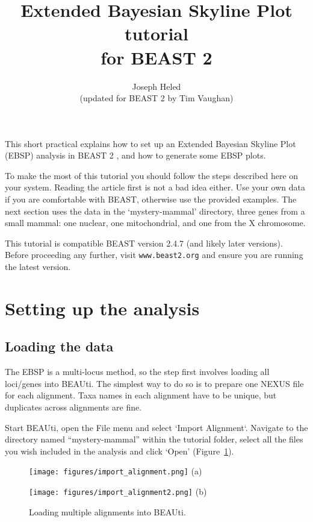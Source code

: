 \documentclass[a4paper,11pt]{article}
\title{Extended Bayesian Skyline Plot tutorial\\for BEAST 2}
\author{Joseph Heled\\(updated for BEAST 2 by Tim Vaughan)}
\date{}
\begin{document}
\maketitle

This short practical explains how to set up an Extended Bayesian Skyline Plot
(EBSP) analysis in BEAST 2 \citep{Bouckaert2014}, and how to generate some EBSP
plots.

To make the most of this tutorial you should follow the steps described here on
your system. Reading the article \citep{Heled2008} first is not a bad idea
either. Use your own data if you are comfortable with BEAST, otherwise use the
provided examples.  The next section uses the data in the `mystery-mammal'
directory, three genes from a small mammal: one nuclear, one mitochondrial, and
one from the X chromosome.

This tutorial is compatible BEAST version 2.4.7 (and likely later
versions). Before proceeding any further, visit
\texttt{www.beast2.org} and ensure you are running the latest version.

\section{Setting up the analysis}

\subsection{Loading the data}

The EBSP is a multi-locus method, so the step first involves loading all
loci/genes into BEAUti. The simplest way to do so is to prepare one NEXUS file
for each alignment. Taxa names in each alignment have to be unique, but
duplicates across alignments are fine.

Start BEAUti, open the File menu and select `Import Alignment`.  Navigate to
the directory named ``mystery-mammal'' within the tutorial folder, select all the files you wish included in the analysis and
click `Open' (Figure~\ref{fig:importAlignment}).

\begin{figure}[h!]
    \centering
    \hspace{-0.5cm}\begin{minipage}[b]{0.4\textwidth}
        \begin{center}
            \texttt{[image: figures/import\_alignment.png]}
            (a)
        \end{center}
    \end{minipage}\hspace{0.5cm}\begin{minipage}[b]{0.6\textwidth}
        \begin{center}
            \texttt{[image: figures/import\_alignment2.png]}
            (b)
        \end{center}
    \end{minipage}
    \caption{Loading multiple alignments into BEAUti.}
\label{fig:importAlignment}
\end{figure}
\end{document}
